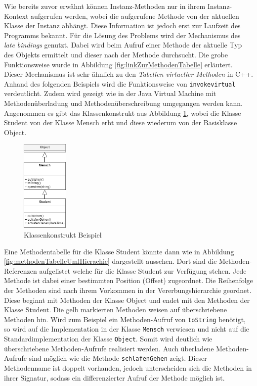 \documentclass[conference]{IEEEtran}
\begin{document}
Wie bereits zuvor erwähnt können Instanz-Methoden nur in ihrem Instanz-Kontext aufgerufen werden, wobei die aufgerufene Methode von der aktuellen Klasse der Instanz abhängt. Diese Information ist jedoch erst zur Laufzeit des Programms bekannt. Für die Lösung des Problems wird der Mechanismus des \textit{late bindings} genutzt. Dabei wird beim Aufruf einer Methode der aktuelle Typ des Objekts ermittelt und dieser nach der Methode durchsucht. Die grobe Funktionsweise wurde in Abbildung \ref{fig:linkZurMethodenTabelle} erläutert. Dieser Mechanismus ist sehr ähnlich zu den \textit{Tabellen virtueller Methoden} in C++. Anhand des folgenden Beispiels wird die Funktionsweise von \verb|invokevirtual| verdeutlicht. Zudem wird gezeigt wie in der Java Virtual Machine mit Methodenüberladung und Methodenüberschreibung umgegangen werden kann. Angenommen es gibt das Klassenkonstrukt aus Abbildung \ref{fig:umlHierarchie}, wobei die Klasse Student von der Klasse Mensch erbt und diese wiederum von der Basisklasse Object.
\begin{figure}[htbp] 
  \centering
     \includegraphics[width=0.2\textwidth]{Grafiken/UMLHierarchie.png}
  \caption{Klassenkonstrukt Beispiel}
  \label{fig:umlHierarchie}
\end{figure}
Eine Methodentabelle für die Klasse Student könnte dann wie in Abbildung \ref{fig:methodenTabelleUmlHierachie} dargestellt aussehen. Dort sind die Methoden-Referenzen aufgelistet  welche für die Klasse Student zur Verfügung stehen. Jede Methode ist dabei einer bestimmten Position (Offset) zugeordnet. Die Reihenfolge der Methoden sind nach ihrem Vorkommen in der Vererbungshierarchie geordnet. Diese beginnt mit Methoden der Klasse Object und endet mit den Methoden der Klasse Student. Die gelb markierten Methoden weisen auf überschriebene Methoden hin. Wird zum Beispiel ein Methoden-Aufruf von \verb|toString| benötigt, so wird auf die Implementation in der Klasse \verb|Mensch| verwiesen und nicht auf die Standardimplementation der Klasse \verb|Object|. Somit wird deutlich wie überschriebene Methoden-Aufrufe realisiert werden. Auch überladene Methoden-Aufrufe sind möglich wie die Methode \verb|schlafenGehen| zeigt. Dieser Methodenname ist doppelt vorhanden, jedoch unterscheiden sich die Methoden in ihrer Signatur, sodass ein differenzierter Aufruf der Methode möglich ist.\cite{Venners.1999}
\end{document}
